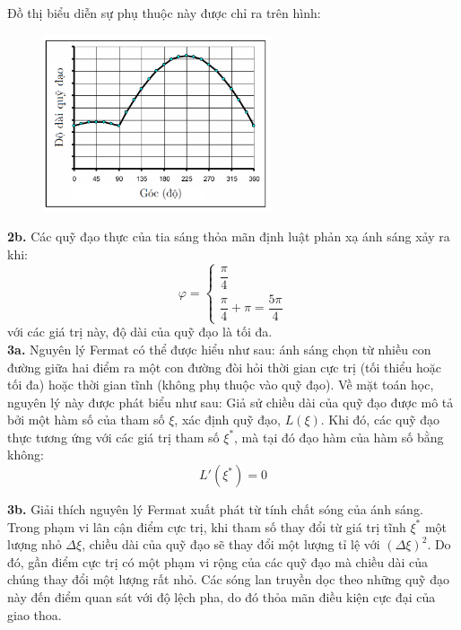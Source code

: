 \noindent Đồ thị biểu diễn sự phụ thuộc này được chỉ ra trên hình:
\begin{figure}[h]
  \centering
  \includegraphics[width=0.6\textwidth]{Figures/P3/Fig 3.8S.png}
\end{figure}

\noindent\textbf{2b.} Các quỹ đạo thực của tia sáng thỏa mãn định luật phản xạ ánh sáng xảy ra khi:
\begin{equation}
  \label{eq:331}
  \varphi=\begin{cases}
    \dfrac{\pi}{4} \\
    \dfrac{\pi}{4}+\pi=\dfrac{5\pi}{4}
  \end{cases}
\end{equation}
với các giá trị này, độ dài của quỹ đạo là tối đa.\\

\noindent\textbf{3a.} Nguyên lý Fermat có thể được hiểu như sau: ánh sáng chọn từ nhiều con đường giữa hai điểm ra một con đường đòi hỏi thời gian cực trị (tối thiểu hoặc tối đa) hoặc thời gian tĩnh (không phụ thuộc vào quỹ đạo). Về mặt toán học, nguyên lý này được phát biểu như sau: Giả sử chiều dài của quỹ đạo được mô tả bởi một hàm số của tham số $\xi$, xác định quỹ đạo, $L(\xi)$. Khi đó, các quỹ đạo thực tương ứng với các giá trị tham số $\xi^*$, mà tại đó đạo hàm của hàm số bằng không:
\begin{equation}
  \label{eq:332}
  L'(\xi^*)=0
\end{equation}

\noindent\textbf{3b.} Giải thích nguyên lý Fermat xuất phát từ tính chất sóng của ánh sáng. Trong phạm vi lân cận điểm cực trị, khi tham số thay đổi từ giá trị tĩnh $\xi^*$ một lượng nhỏ $\Delta\xi$, chiều dài của quỹ đạo sẽ thay đổi một lượng tỉ lệ với $(\Delta\xi)^2$. Do đó, gần điểm cực trị có một phạm vi rộng của các quỹ đạo mà chiều dài của chúng thay đổi một lượng rất nhỏ. Các sóng lan truyền dọc theo những quỹ đạo này đến điểm quan sát với độ lệch pha, do đó thỏa mãn điều kiện cực đại của giao thoa.






















